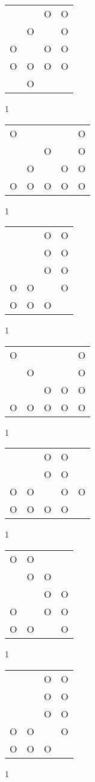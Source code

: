 \begin{tabular}{|m{0.2cm}m{0.2cm}m{0.2cm}m{0.2cm}|}\hline
 & &O&O\\
 &O& &O\\
O& &O&O\\
O&O&O&O\\
 &O& & \\
\hline\end{tabular}1
\begin{tabular}{|m{0.2cm}m{0.2cm}m{0.2cm}m{0.2cm}m{0.2cm}|}\hline
O& & & &O\\
 & &O& &O\\
 &O& &O&O\\
O&O&O&O&O\\
\hline\end{tabular}1
\begin{tabular}{|m{0.2cm}m{0.2cm}m{0.2cm}m{0.2cm}|}\hline
 & &O&O\\
 & &O&O\\
 & &O&O\\
O&O& &O\\
O&O&O& \\
\hline\end{tabular}1
\begin{tabular}{|m{0.2cm}m{0.2cm}m{0.2cm}m{0.2cm}m{0.2cm}|}\hline
O& & & &O\\
 &O& & &O\\
 & &O&O&O\\
O&O&O&O&O\\
\hline\end{tabular}1
\begin{tabular}{|m{0.2cm}m{0.2cm}m{0.2cm}m{0.2cm}m{0.2cm}|}\hline
 & &O&O& \\
 & &O&O& \\
O&O& &O&O\\
O&O&O&O& \\
\hline\end{tabular}1
\begin{tabular}{|m{0.2cm}m{0.2cm}m{0.2cm}m{0.2cm}|}\hline
O&O& & \\
 &O&O& \\
 & &O&O\\
O& &O&O\\
O&O& &O\\
\hline\end{tabular}1
\begin{tabular}{|m{0.2cm}m{0.2cm}m{0.2cm}m{0.2cm}|}\hline
 & &O&O\\
 & &O&O\\
 & &O&O\\
O&O& &O\\
O&O&O& \\
\hline\end{tabular}1
